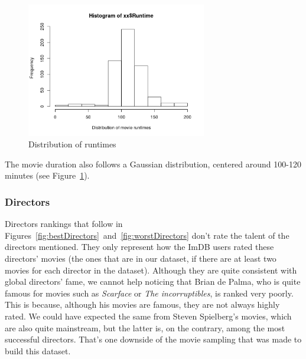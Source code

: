 \newpage
\begin{figure}[!ht]
\begin{center}
\includegraphics[width=0.70\textwidth]{../src/pre-processing/stats/results/distRuntime.png}
\end{center}
\caption{Distribution of runtimes}
\label{fig:distRuntime}
\end{figure}
The movie duration also follows a Gaussian distribution, centered around 100-120 minutes (see Figure~\ref{fig:distRuntime}).

\subsubsection{Directors}
\label{subs:Directors}

Directors rankings that follow in Figures~\ref{fig:bestDirectors}~and~\ref{fig:worstDirectors} don't rate the talent of the directors mentioned.
They only represent how the ImDB users rated these directors' movies (the ones that are in our dataset, if there are at least two movies for each director in the dataset).
Although they are quite consistent with global directors' fame, we cannot help noticing that Brian de Palma, who is quite famous for movies such as \textit{Scarface} or \textit{The incorruptibles}, is ranked very poorly.
This is because, although his movies are famous, they are not always highly rated.
We could have expected the same from Steven Spielberg's movies, which are also quite mainstream, but the latter is, on the contrary, among the most successful directors.
That's one downside of the movie sampling that was made to build this dataset.

